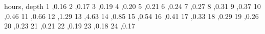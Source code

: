 hours,  depth
1 ,0.16
2 ,0.17
3 ,0.19
4 ,0.20
5 ,0.21
6 ,0.24
7 ,0.27
8 ,0.31
9 ,0.37
10 ,0.46
11 ,0.66
12 ,1.29
13 ,4.63
14 ,0.85
15 ,0.54
16 ,0.41
17 ,0.33
18 ,0.29
19 ,0.26
20 ,0.23
21 ,0.21
22 ,0.19
23 ,0.18
24 ,0.17